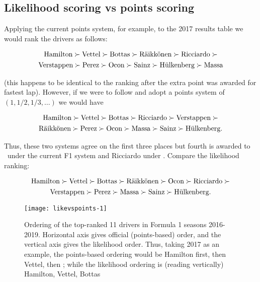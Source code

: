 \documentclass[a4,12pt]{article}
\begin{document}
\subsection{Likelihood scoring vs points
scoring}\label{likelihood-scoring-vs-points-scoring}

Applying the current points system, for example, to the 2017 results
table we would rank the drivers as follows:

\begin{multline}\nonumber
\mbox{Hamilton}\succ
\mbox{Vettel}\succ
\mbox{Bottas}\succ
\mbox{R\"{a}ikk\"{o}nen}\succ
\mbox{Ricciardo}\succ\\
\mbox{Verstappen}\succ
\mbox{Perez}\succ
\mbox{Ocon}\succ
\mbox{Sainz}\succ
\mbox{H\"{u}lkenberg}\succ
\mbox{Massa}
\end{multline}

\noindent (this happens to be identical to the ranking after the extra
point was awarded for fastest lap).  However, if we were to follow
\citet{zipf1949} and adopt a points system of $(1,1/2,1/3,\ldots)$ we
would have

\begin{multline}\nonumber
\mbox{Hamilton}\succ
\mbox{Vettel}\succ
\mbox{Bottas}\succ
\mbox{Ricciardo}\succ
\mbox{Verstappen}\succ\\
\mbox{R\"{a}ikk\"{o}nen}\succ
\mbox{Perez}\succ
\mbox{Ocon}\succ
\mbox{Massa}\succ
\mbox{Sainz}\succ
\mbox{H\"{u}lkenberg}.
\end{multline}

\noindent Thus, these two systems agree on the first three places but
fourth is awarded to \raik\ under the current F1 system and Ricciardo
under \citeauthor{zipf1949}.  Compare the likelihood ranking:

\begin{multline}\nonumber
\mbox{Hamilton}\succ
\mbox{Vettel}\succ
\mbox{Bottas}\succ
\mbox{R\"{a}ikk\"{o}nen}\succ
\mbox{Ocon}\succ
\mbox{Ricciardo}\succ\\
\mbox{Verstappen}\succ
\mbox{Perez}\succ
\mbox{Massa}\succ
\mbox{Sainz}\succ
\mbox{H\"{u}lkenberg}.
\end{multline}

\begin{figure}
{\centering \texttt{[image: likevspoints-1]}}
\caption{\doublespacing Ordering of
  the \label{orderingbypointsandlikelihood} top-ranked 11 drivers in
  Formula 1 seasons 2016-2019.  Horizontal axis gives official
  (points-based) order, and the vertical axis gives the likelihood
  order.  Thus, taking 2017 as an example, the points-based ordering
  would be Hamilton first, then Vettel, then \raik; while the
  likelihood ordering is (reading vertically) Hamilton, Vettel, Bottas
}\label{fig:likevspoints}
\end{figure}
\end{document}
